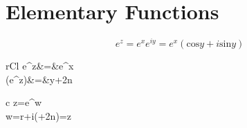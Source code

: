 \documentclass[nobib,notoc]{tufte-handout}
\begin{document}
\section{Elementary Functions}
\begin{ident}
	\begin{equation*}
		e^z=e^xe^{iy}=e^x(\text{cos}y+i\text{sin}y)
	\end{equation*}
\end{ident}
\begin{cor}
	\begin{IEEEeqnarray*}{rCl}
		\lvert e^z\rvert&=&e^x\\
		(e^z)&=&y+2n\pi
	\end{IEEEeqnarray*}
\end{cor}
\begin{ident}
	\begin{IEEEeqnarray*}{c}
		z=e^w\\
		w=r+i(\Theta+2n\pi)=z
	\end{IEEEeqnarray*}
\end{ident}
\end{document}
